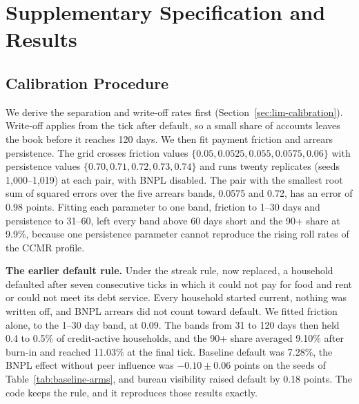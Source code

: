 \section{Supplementary Specification and Results}
\label{app:supplementary}

\subsection{Calibration Procedure}
\label{app:calibration}

We derive the separation and write-off rates first (Section~\ref{sec:lim-calibration}).
Write-off applies from the tick after default, so a small share of accounts leaves the book
before it reaches 120 days.
We then fit payment friction and arrears persistence. The grid crosses friction values
$\{0.05,\allowbreak 0.0525,\allowbreak 0.055,\allowbreak 0.0575,\allowbreak 0.06\}$ with
persistence values $\{0.70,\allowbreak 0.71,\allowbreak 0.72,\allowbreak 0.73,\allowbreak 0.74\}$
and runs twenty replicates (seeds 1{,}000--1{,}019) at each pair, with \ac{BNPL} disabled. The pair
with the smallest root sum of squared errors over the five arrears bands, 0.0575 and 0.72, has an
error of 0.98 points. Fitting each parameter to one band, friction to 1--30 days and persistence
to 31--60, left every band above 60 days short and the 90+ share at 9.9\%, because one persistence
parameter cannot reproduce the rising roll rates of the \ac{CCMR} profile.

\textbf{The earlier default rule.} Under the streak rule, now replaced, a household
defaulted after seven consecutive ticks in which it could not pay for food and rent or could not
meet its debt service. Every household started current, nothing was written off, and \ac{BNPL}
arrears did not count toward default. We fitted friction alone, to the 1--30 day band, at 0.09.
The bands from 31 to 120 days then held 0.4 to 0.5\% of credit-active households, and the 90+
share averaged 9.10\% after burn-in and reached 11.03\% at the final tick. Baseline default was
7.28\%, the \ac{BNPL} effect without peer influence was $-0.10 \pm 0.06$ points on the seeds of
Table~\ref{tab:baseline-arms}, and bureau visibility raised default by 0.18 points. The code keeps
the rule, and it reproduces those results exactly.

